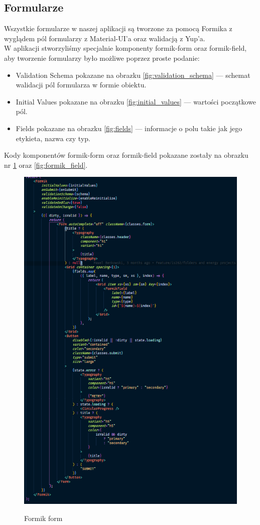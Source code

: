 \documentclass[a4paper,11pt]{report}
\begin{document}
\subsection{Formularze}
\label{subsec:forms}
Wszystkie formularze w naszej aplikacji są tworzone za pomocą Formika z wyglądem pól formularzy z Material-UI'a oraz walidacją z Yup'a.\\
W aplikacji stworzyliśmy specjalnie komponenty formik-form oraz formik-field, aby tworzenie formularzy było możliwe poprzez proste podanie:
\begin{itemize}
	\item Validation Schema pokazane na obrazku \ref{fig:validation_schema} — schemat walidacji pól formularza w formie obiektu.
	\item Initial Values pokazane na obrazku \ref{fig:initial_values} — wartości początkowe pól.
	\item Fields pokazane na obrazku \ref{fig:fields} — informacje o polu takie jak jego etykieta, nazwa czy typ.
\end{itemize}
Kody komponentów formik-form oraz formik-field pokazane zostały na obrazku nr \ref{fig:formik_form} oraz \ref{fig:formik_field}.
\begin{figure}[H]
	\centering
	\includegraphics[scale=0.7]{implementacja/frontend/formik_form}\\
	\caption{Formik form}
	\label{fig:formik_form}
\end{figure}
\end{document}
